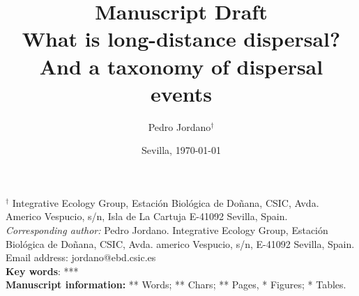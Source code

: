 \documentclass[a4paper, 12pt]{article}
\begin{document}
\title{Manuscript Draft\\
\vspace{2cm}
What is long-distance dispersal? And a taxonomy of dispersal events}

\author{Pedro Jordano$^{\dag}$}

\date{Sevilla, \today}
\maketitle


\begin{spacing}{1.0}
$^{\dag}$ {\small Integrative Ecology Group, Estaci\'on Biol\'ogica de 
Do\~nana, CSIC, Avda. Americo Vespucio, s/n, Isla de La Cartuja
E-41092 Sevilla, Spain.}\\


{\small \textit{Corresponding author:} Pedro Jordano. Integrative Ecology Group, Estaci\'on Biol\'ogica de Do\~nana, CSIC, Avda. americo Vespucio, s/n, E-41092 Sevilla, Spain. Email address: jordano@ebd.csic.es}\\

\textbf{Key words}: ***\\

{\small \textbf{Manuscript information: }** Words; ** Chars; ** Pages, * Figures; * Tables.}
\end{spacing}

\maketitle
\newpage

\end{document}
